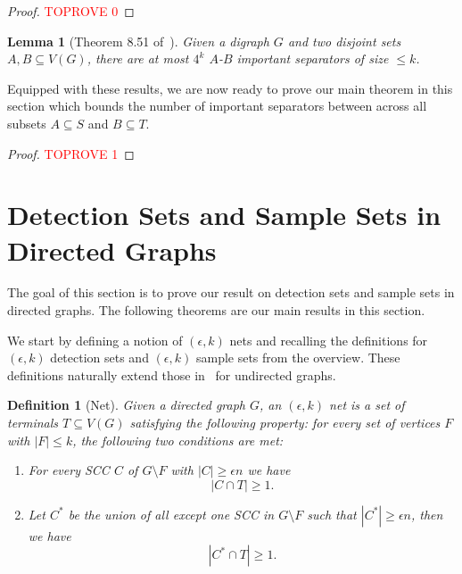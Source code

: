 \documentclass[11pt]{article}
\newtheorem{lemma}[theorem]{Lemma}
\newtheorem{definition}[theorem]{Definition}
\begin{document}
\begin{proof}\textcolor{red}{TOPROVE 0}\end{proof}

\begin{lemma}[Theorem 8.51 of~\cite{cygan2015parameterized}]
Given a digraph $G$ and two disjoint sets $A,B \subseteq V(G)$, there are at most $4^k$ $A$-$B$ important separators of size $\leq k$.
\end{lemma}

Equipped with these results, we are now ready to prove our main theorem in this section which bounds the number of important separators between across all subsets $A \subseteq S$ and $B \subseteq T$.

\impsep*

\begin{proof}\textcolor{red}{TOPROVE 1}\end{proof}




















\section{Detection Sets and Sample Sets in Directed Graphs}
The goal of this section is to prove our result on detection sets and sample sets in directed graphs. The following theorems are our main results in this section.
\detectionset*
\sampleset*





We start by defining a notion of $(\epsilon,k)$ nets and recalling the definitions for $(\epsilon, k)$ detection sets and  $(\epsilon,k)$ sample sets from the overview. These definitions naturally extend those in~\cite{fm06} for undirected graphs.


\begin{definition}[Net]
Given a directed graph $G$, an $(\epsilon, k)$ net is a set of terminals $T \subseteq V(G)$ satisfying the following property: for every set of vertices $F$ with $|F| \leq k$, the following two conditions are met:
\begin{enumerate}
\item For every SCC $C$ of $G \setminus F$ with $|C| \geq \epsilon n$ we have 
$$|C \cap T| \geq 1.$$
\item Let $C^*$ be the union of all except one SCC in $G \setminus F$ such that $|C^*| \geq \epsilon n$, then we have
$$|C^* \cap T| \geq 1.$$
\end{enumerate}
\end{definition}
\end{document}
